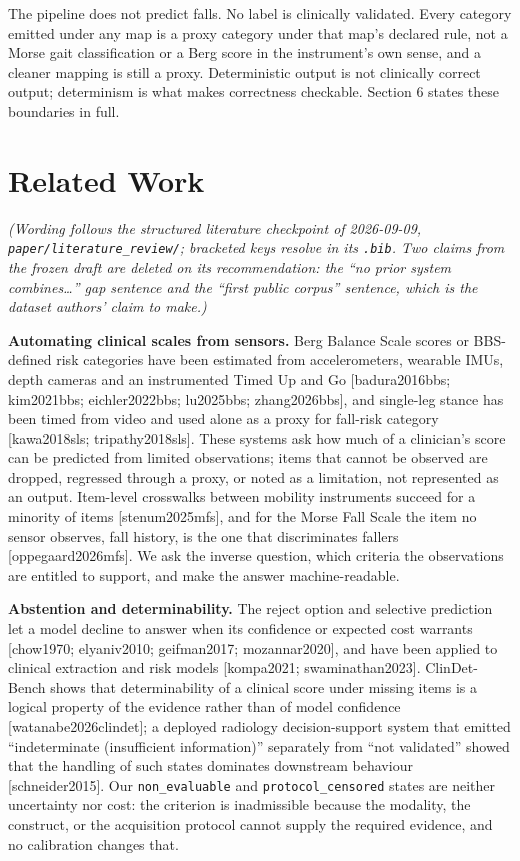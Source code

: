\documentclass[11pt]{article}
\begin{document}
The pipeline does not predict falls. No label is clinically validated. Every category emitted under any map is a proxy category under that map's declared rule, not a Morse gait classification or a Berg score in the instrument's own sense, and a cleaner mapping is still a proxy. Deterministic output is not clinically correct output; determinism is what makes correctness checkable. Section 6 states these boundaries in full.

\section{Related Work}\label{related-work}

\emph{(Wording follows the structured literature checkpoint of 2026-09-09, \texttt{paper/literature\_review/}; bracketed keys resolve in its \texttt{.bib}. Two claims from the frozen draft are deleted on its recommendation: the ``no prior system combines\ldots{}'' gap sentence and the ``first public corpus'' sentence, which is the dataset authors' claim to make.)}

\textbf{Automating clinical scales from sensors.} Berg Balance Scale scores or BBS-defined risk categories have been estimated from accelerometers, wearable IMUs, depth cameras and an instrumented Timed Up and Go [badura2016bbs; kim2021bbs; eichler2022bbs; lu2025bbs; zhang2026bbs], and single-leg stance has been timed from video and used alone as a proxy for fall-risk category [kawa2018sls; tripathy2018sls]. These systems ask how much of a clinician's score can be predicted from limited observations; items that cannot be observed are dropped, regressed through a proxy, or noted as a limitation, not represented as an output. Item-level crosswalks between mobility instruments succeed for a minority of items [stenum2025mfs], and for the Morse Fall Scale the item no sensor observes, fall history, is the one that discriminates fallers [oppegaard2026mfs]. We ask the inverse question, which criteria the observations are entitled to support, and make the answer machine-readable.

\textbf{Abstention and determinability.} The reject option and selective prediction let a model decline to answer when its confidence or expected cost warrants [chow1970; elyaniv2010; geifman2017; mozannar2020], and have been applied to clinical extraction and risk models [kompa2021; swaminathan2023]. ClinDet-Bench shows that determinability of a clinical score under missing items is a logical property of the evidence rather than of model confidence [watanabe2026clindet]; a deployed radiology decision-support system that emitted ``indeterminate (insufficient information)'' separately from ``not validated'' showed that the handling of such states dominates downstream behaviour [schneider2015]. Our \texttt{non\_evaluable} and \texttt{protocol\_censored} states are neither uncertainty nor cost: the criterion is inadmissible because the modality, the construct, or the acquisition protocol cannot supply the required evidence, and no calibration changes that.
\end{document}
